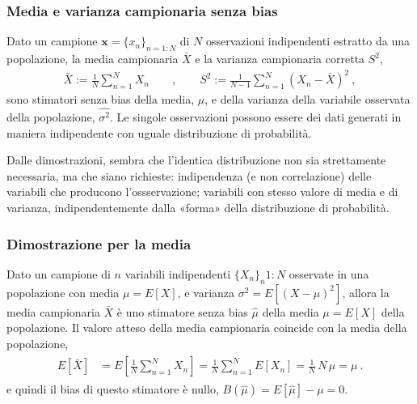 \documentclass[letterpaper,10pt,italian]{jupyterBook}
\begin{document}
\subsubsection{Media e varianza campionaria senza bias}
\label{\detokenize{ch/statistics/estimate:media-e-varianza-campionaria-senza-bias}}
\sphinxAtStartPar
Dato un campione \(\mathbf{x} = \{ x_n \}_{n=1:N}\) di \(N\) osservazioni indipendenti estratto da una popolazione, la media campionaria \(\bar{X}\) e la varianza campionaria corretta \(S^2\),
\begin{equation*}
\begin{split}\bar{X} := \frac{1}{N} \sum_{n = 1}^{N} X_n \qquad , \qquad S^2 := \frac{1}{N-1} \sum_{n=1}^N (X_n - \bar{X})^2 \ ,\end{split}
\end{equation*}
\sphinxAtStartPar
sono stimatori senza bias della media, \(\hat{\mu}\), e della varianza della variabile osservata della popolazione, \(\hat{\sigma^2}\). Le singole osservazioni possono essere dei dati generati in maniera indipendente con uguale distribuzione di probabilità.

\sphinxAtStartPar
{}  Dalle dimostrazioni, sembra che l’identica distribuzione non sia strettamente necessaria, ma che siano richieste: indipendenza (e non correlazione) delle variabili che producono l’ossservazione; variabili con stesso valore di media e di varianza, indipendentemente dalla «forma» della distribuzione di probabilità.
\subsubsection*{Dimostrazione per la media}

\sphinxAtStartPar
Dato un campione di \(n\) variabili indipendenti \(\{ X_n \}_n{1:N}\) osservate in una popolazione con media \(\mu = E[X]\), e varianza \(\sigma^2 = E\left[ (X-\mu)^2 \right]\), allora la media campionaria \(\bar{X}\) è uno stimatore senza bias \(\hat{\mu}\) della media \(\mu = E[X]\) della popolazione. Il valore atteso della media campionaria coincide con la media della popolazione,
\begin{equation*}
\begin{split}\begin{aligned}
  E[\bar{X}] 
  & = E\left[ \frac{1}{N} \sum_{n=1}^N X_n \right]
    = \frac{1}{N} \sum_{n=1}^N E\left[ X_n \right] = \frac{1}{N} \, N \, \mu = \mu \ .
\end{aligned}\end{split}
\end{equation*}
\sphinxAtStartPar
e quindi il bias di questo stimatore è nullo, \(B(\hat{\mu}) = E[\hat{\mu}] - \mu = 0\).
\end{document}
